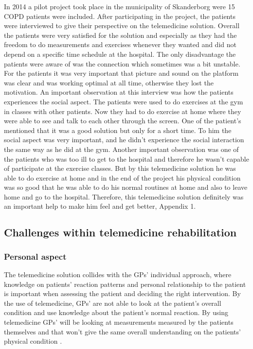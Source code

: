 In 2014 a pilot project took place in the municipality of Skanderborg were 15 COPD patients were included. After participating in the project, the patients were interviewed to give their perspective on the telemedicine solution. Overall the patients were very satisfied for the solution and especially as they had the freedom to do measurements and exercises whenever they wanted and did not depend on a specific time schedule at the hospital. The only disadvantage the patients were aware of was the connection which sometimes was a bit unstable. For the patients it was very important that picture and sound on the platform was clear and was working optimal at all time, otherwise they lost the motivation. An important observation at this interview was how the patients experiences the social aspect. The patients were used to do exercises at the gym in classes with other patients. Now they had to do exercise at home where they were able to see and talk to each other through the screen. One of the patient’s mentioned that it was a good solution but only for a short time. To him the social aspect was very important, and he didn’t experience the social interaction the same way as he did at the gym. Another important observation was one of the patients who was too ill to get to the hospital and therefore he wasn’t capable of participate at the exercise classes. But by this telemedicine solution he was able to do exercise at home and in the end of the project his physical condition was so good that he was able to do his normal routines at home and also to leave home and go to the hospital. Therefore, this telemedicine solution definitely was an important help to make him feel and get better, Appendix 1. 


\subsection{Challenges within telemedicine rehabilitation} 
\subsubsection{Personal aspect}
The telemedicine solution collides with the GPs’ individual approach, where knowledge on patients’ reaction patterns and personal relationship to the patient is important when assessing the patient and deciding the right intervention. By the use of telemedicine, GPs’ are not able to look at the patient’s overall condition and use knowledge about the patient’s normal reaction. By using telemedicine GPs’ will be looking at measurements measured by the patients themselves and that won’t give the same overall understanding on the patients’ physical condition \cite{Emergence}.  

